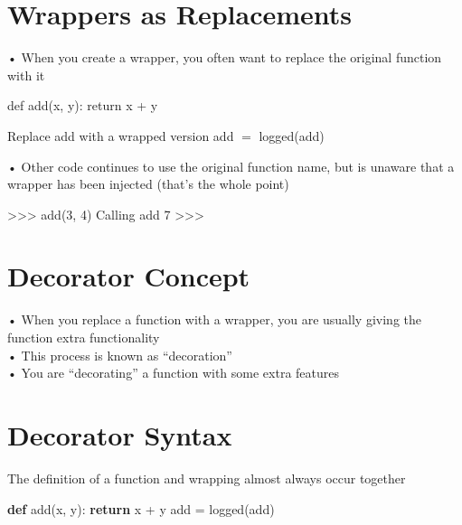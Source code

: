 \documentclass[
  letterpaper,
  DIV=11,
  numbers=noendperiod]{scrreprt}
\newenvironment{Shaded}{\begin{snugshade}}{\end{snugshade}}
\newcommand{\ControlFlowTok}[1]{\textcolor[rgb]{0.00,0.23,0.31}{\textbf{#1}}}
\newcommand{\KeywordTok}[1]{\textcolor[rgb]{0.00,0.23,0.31}{\textbf{#1}}}
\newcommand{\NormalTok}[1]{\textcolor[rgb]{0.00,0.23,0.31}{#1}}
\newcommand{\OperatorTok}[1]{\textcolor[rgb]{0.37,0.37,0.37}{#1}}
\begin{document}

\chapter{Wrappers as Replacements}\label{wrappers-as-replacements}

• When you create a wrapper, you often want to replace the original
function with it

\begin{Shaded}
\begin{Highlighting}[]
\NormalTok{def add(x, y): return x + y }
\end{Highlighting}
\end{Shaded}

Replace add with a wrapped version add \(=\) logged(add)

• Other code continues to use the original function name, but is unaware
that a wrapper has been injected (that's the whole point)

\begin{Shaded}
\begin{Highlighting}[]
\NormalTok{\textgreater{}\textgreater{}\textgreater{} add(3, 4)  }
\NormalTok{Calling add  }
\NormalTok{7  }
\NormalTok{\textgreater{}\textgreater{}\textgreater{} }
\end{Highlighting}
\end{Shaded}


\chapter{Decorator Concept}\label{decorator-concept}

• When you replace a function with a wrapper, you are usually giving the
function extra functionality\\
• This process is known as ``decoration''\\
• You are ``decorating'' a function with some extra features


\chapter{Decorator Syntax}\label{decorator-syntax}

The definition of a function and wrapping almost always occur together

\begin{Shaded}
\begin{Highlighting}[]
\KeywordTok{def}\NormalTok{ add(x, y):}
    \ControlFlowTok{return}\NormalTok{ x }\OperatorTok{+}\NormalTok{ y}
\NormalTok{add }\OperatorTok{=}\NormalTok{ logged(add) }
\end{Highlighting}
\end{Shaded}
\end{document}

